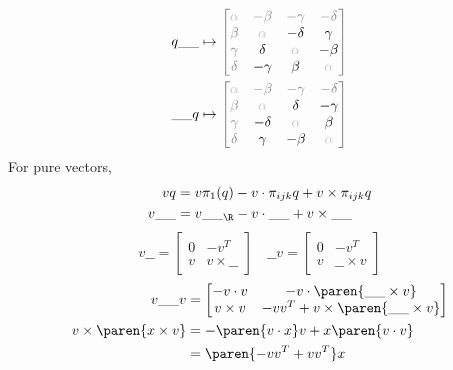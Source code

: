 \documentclass{scrartcl}
\newcommand{\black}[1]{{\color{black}{#1}}}
\renewcommand{\blank}{\_\_}
\begin{document}
\begin{multicols*}{2}
  \newcommand{\lightgray}[1]{{\color{lightgray}#1}}
  \begin{align*}
    q \blank  &\mapsto
                \color{gray}
    \begin{bmatrix}
      \lightgray\alpha & - \beta & -\gamma & -\delta  \\
      \beta & \lightgray\alpha   & \black{-\delta} & \black{\gamma} \\
      \gamma & \black{\delta} & \lightgray\alpha & \black{-\beta}  \\
      \delta & \black{-\gamma} & \black\beta & \lightgray\alpha
    \end{bmatrix} \\
     \blank q  &\mapsto
                \color{gray}
    \begin{bmatrix}
      \lightgray\alpha & - \beta & -\gamma & -\delta  \\
      \beta & \lightgray\alpha   & \black{\delta} & \black{-\gamma} \\
      \gamma & \black{-\delta} & \lightgray\alpha & \black{\beta}  \\
      \delta & \black{\gamma} & \black{-\beta} & \lightgray\alpha
    \end{bmatrix}
  \end{align*}
  For pure vectors,
  \begin{align*}
    v q &= v\pi_{1}(q) -v\cdot \pi_{ijk} q + v\times \pi_{ijk} q \\
    v\blank &= v\blank_{\R} - v\cdot\blank + v\times\blank
  \end{align*}
  \[
    v\blank =
    \begin{bmatrix}
      0 & -v^T \\
      v & v\times\blank
    \end{bmatrix}
    \quad
    \blank v =
    \begin{bmatrix}
      0 & -v^T \\
      v & \blank\times v
    \end{bmatrix}
  \]
  \begin{align*}
    v\blank v &=
    \begin{bmatrix}
      -v\cdot v & -v\cdot \paren{\blank\times v} \\
      v\times v & -vv^T+ v\times \paren{\blank\times v}
    \end{bmatrix} \\
    v\times\paren{x\times v} &= -\paren{v\cdot x} v + x\paren{v\cdot v} \\
    &= \paren{-vv^T+ vv^T}x \\

\end{align*}
\end{multicols*}
\end{document}
